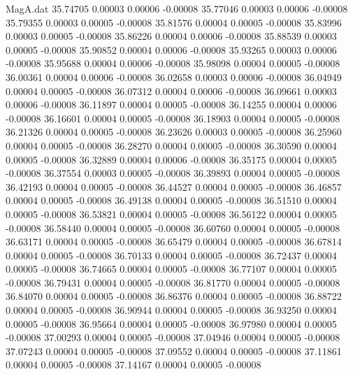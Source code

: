 \begin{filecontents}{MagA.dat}
  35.74705    0.00003    0.00006   -0.00008
  35.77046    0.00003    0.00006   -0.00008
  35.79355    0.00003    0.00005   -0.00008
  35.81576    0.00004    0.00005   -0.00008
  35.83996    0.00003    0.00005   -0.00008
  35.86226    0.00004    0.00006   -0.00008
  35.88539    0.00003    0.00005   -0.00008
  35.90852    0.00004    0.00006   -0.00008
  35.93265    0.00003    0.00006   -0.00008
  35.95688    0.00004    0.00006   -0.00008
  35.98098    0.00004    0.00005   -0.00008
  36.00361    0.00004    0.00006   -0.00008
  36.02658    0.00003    0.00006   -0.00008
  36.04949    0.00004    0.00005   -0.00008
  36.07312    0.00004    0.00006   -0.00008
  36.09661    0.00003    0.00006   -0.00008
  36.11897    0.00004    0.00005   -0.00008
  36.14255    0.00004    0.00006   -0.00008
  36.16601    0.00004    0.00005   -0.00008
  36.18903    0.00004    0.00005   -0.00008
  36.21326    0.00004    0.00005   -0.00008
  36.23626    0.00003    0.00005   -0.00008
  36.25960    0.00004    0.00005   -0.00008
  36.28270    0.00004    0.00005   -0.00008
  36.30590    0.00004    0.00005   -0.00008
  36.32889    0.00004    0.00006   -0.00008
  36.35175    0.00004    0.00005   -0.00008
  36.37554    0.00003    0.00005   -0.00008
  36.39893    0.00004    0.00005   -0.00008
  36.42193    0.00004    0.00005   -0.00008
  36.44527    0.00004    0.00005   -0.00008
  36.46857    0.00004    0.00005   -0.00008
  36.49138    0.00004    0.00005   -0.00008
  36.51510    0.00004    0.00005   -0.00008
  36.53821    0.00004    0.00005   -0.00008
  36.56122    0.00004    0.00005   -0.00008
  36.58440    0.00004    0.00005   -0.00008
  36.60760    0.00004    0.00005   -0.00008
  36.63171    0.00004    0.00005   -0.00008
  36.65479    0.00004    0.00005   -0.00008
  36.67814    0.00004    0.00005   -0.00008
  36.70133    0.00004    0.00005   -0.00008
  36.72437    0.00004    0.00005   -0.00008
  36.74665    0.00004    0.00005   -0.00008
  36.77107    0.00004    0.00005   -0.00008
  36.79431    0.00004    0.00005   -0.00008
  36.81770    0.00004    0.00005   -0.00008
  36.84070    0.00004    0.00005   -0.00008
  36.86376    0.00004    0.00005   -0.00008
  36.88722    0.00004    0.00005   -0.00008
  36.90944    0.00004    0.00005   -0.00008
  36.93250    0.00004    0.00005   -0.00008
  36.95664    0.00004    0.00005   -0.00008
  36.97980    0.00004    0.00005   -0.00008
  37.00293    0.00004    0.00005   -0.00008
  37.04946    0.00004    0.00005   -0.00008
  37.07243    0.00004    0.00005   -0.00008
  37.09552    0.00004    0.00005   -0.00008
  37.11861    0.00004    0.00005   -0.00008
  37.14167    0.00004    0.00005   -0.00008

\end{filecontents}
